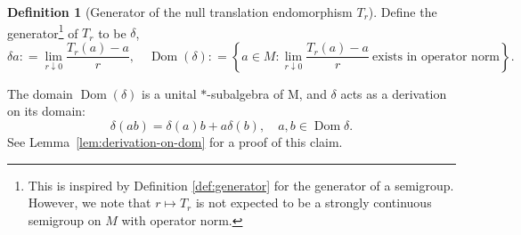 \documentclass[11pt,a4paper]{article}
\theoremstyle{plain}
\numberwithin{theorem}{section}
\theoremstyle{definition}
\newtheorem{definition}[theorem]{Definition}
\newcommand{\?}{\overset{?}{=}}
\newcommand{\defeq}{\mathrel{\mathop:}=}
\newcommand{\lbr}{\left \{}
\newcommand{\rbr}{\right \}}
\renewcommand{\d}{\delta}	%
\DeclareMathOperator{\Dom}{Dom}
\begin{document}
\begin{definition}[Generator of the null translation endomorphism $T_r$]
Define the generator\footnote{This is inspired by Definition \ref{def:generator} for the generator of a semigroup. However, we note that $r\mapsto T_r$ is not expected to be a strongly continuous semigroup on $M$ with operator norm.} of $T_r$ to be $\d$,
\begin{equation}\label{eq:delta-dom-def-main}
    \d a\defeq \lim_{r\downarrow0}\frac{T_r(a)-a}{r}, \quad \Dom(\d)\defeq\lbr a\in M:\lim_{r\downarrow0}\frac{T_r(a)-a}{r} \ \text{exists in operator norm} \rbr.
\end{equation}
\end{definition}
The domain $\Dom(\delta)$ is a unital $*$-subalgebra of M, and $\delta$ acts as a derivation on its domain:
\begin{equation}
    \delta(ab)= \delta(a)b + a\delta(b), \quad a,b\in \Dom \delta.
\end{equation}
See Lemma~\ref{lem:derivation-on-dom} for a proof of this claim.
\end{document}
